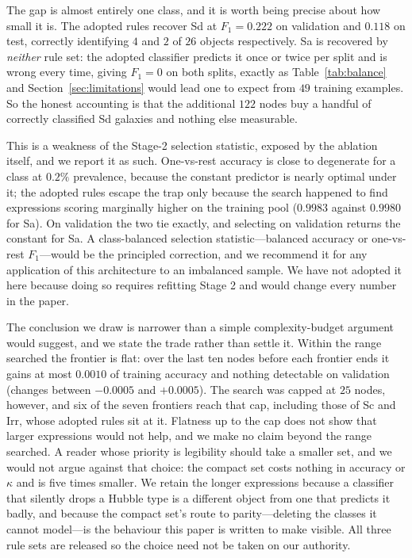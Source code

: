 \documentclass[11pt]{article}
\begin{document}
The gap is almost entirely one class, and it is worth being precise about how
small it is. The adopted rules recover Sd at $F_1 = 0.222$ on validation and
$0.118$ on test, correctly identifying $4$ and $2$ of $26$ objects
respectively. Sa is recovered by \emph{neither} rule set: the adopted
classifier predicts it once or twice per split and is wrong every time, giving
$F_1 = 0$ on both splits, exactly as Table~\ref{tab:balance} and
Section~\ref{sec:limitations} would lead one to expect from $49$ training
examples. So the honest accounting is that the additional $122$ nodes buy a
handful of correctly classified Sd galaxies and nothing else measurable.

This is a weakness of the Stage-2 selection statistic, exposed by the
ablation itself, and we report it as such. One-vs-rest accuracy is close to
degenerate for a class at $0.2\%$ prevalence, because the constant predictor is
nearly optimal under it; the adopted rules escape the trap only because the
search happened to find expressions scoring marginally higher on the training
pool ($0.9983$ against $0.9980$ for Sa). On validation the two tie exactly, and
selecting on validation returns the constant for Sa. A class-balanced selection
statistic---balanced accuracy or one-vs-rest $F_1$---would be the principled
correction, and we recommend it for any application of this architecture to an
imbalanced sample. We have not adopted it here because doing so requires
refitting Stage 2 and would change every number in the paper.

The conclusion we draw is narrower than a simple complexity-budget argument
would suggest, and we state the trade rather than settle it. Within the range
searched the frontier is flat: over the last ten nodes before each frontier ends
it gains at most $0.0010$ of training accuracy and nothing detectable on
validation (changes between $-0.0005$ and $+0.0005$). The search was capped at
$25$ nodes, however, and six of the seven frontiers reach that cap, including
those of Sc and Irr, whose adopted rules sit at it. Flatness up to the cap does
not show that larger expressions would not help, and we make no claim beyond the
range searched. A reader whose priority is legibility should take a smaller
set, and we would not argue against that choice: the compact set costs nothing
in accuracy or $\kappa$ and is five times smaller. We retain the longer
expressions because a classifier that silently drops a Hubble type is a
different object from one that predicts it badly, and because the compact set's
route to parity---deleting the classes it cannot model---is the behaviour this
paper is written to make visible. All three rule sets are released so the choice
need not be taken on our authority.
\end{document}
